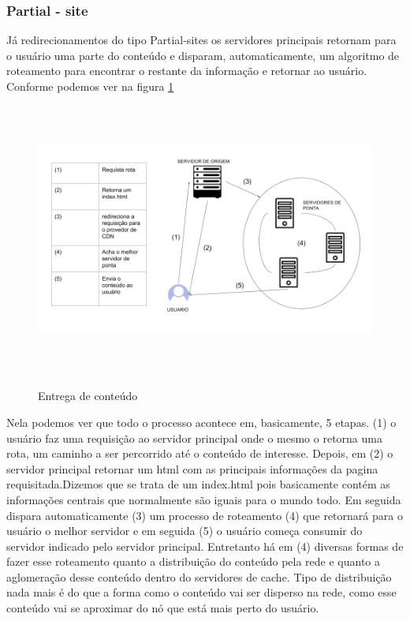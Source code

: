 \subsubsection{Partial - site}
J\'a redirecionamentos do tipo Partial-sites os servidores principais retornam para o usu\'ario uma parte do conte\'udo e disparam, automaticamente, um algoritmo de roteamento para encontrar o restante da informa\c{c}\~ao e retornar ao usu\'ario. Conforme podemos ver na figura \ref{figura:entrega_conteudo}
\begin{figure}[H]
\caption{Entrega de conte\'udo}
\includegraphics[height=9cm]{Figuras/entrega_conteudo.png} 
\label{figura:entrega_conteudo}
\end{figure}
Nela podemos ver que todo o processo acontece em, basicamente, 5 etapas. (1) o usu\'ario faz uma requisi\c{c}\~ao ao servidor principal onde o mesmo o retorna uma rota, um caminho a ser percorrido at\'e o conte\'udo de interesse. Depois, em (2) o servidor principal retornar um html com as principais informa\c{c}\~oes da pagina requisitada.Dizemos que se trata de um index.html pois basicamente cont\'em as informa\c{c}\~oes centrais que normalmente s\~ao iguais para o mundo todo. Em seguida dispara automaticamente (3) um processo de roteamento (4) que retornar\'a para o usu\'ario o melhor servidor e em seguida (5) o usu\'ario come\c{c}a consumir do servidor indicado pelo servidor principal.
\newline
 Entretanto h\'a em (4) diversas formas de fazer esse roteamento quanto a distribui\c{c}\~ao do conte\'udo pela rede e quanto a aglomera\c{c}\~ao desse conte\'udo dentro do servidores de cache. 
\newline Tipo de distribui\c{c}\~ao nada mais \'e do que a forma como o conte\'udo vai ser disperso na rede, como esse conte\'udo vai se aproximar do n\'o que est\'a mais perto do usu\'ario. 

